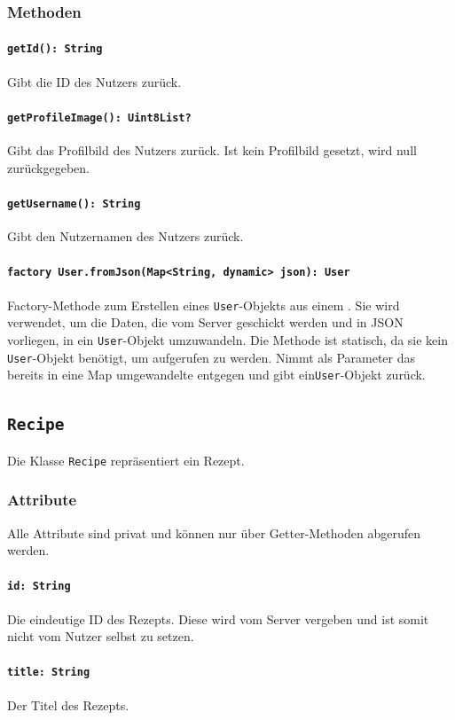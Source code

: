 \documentclass[parskip=full]{scrartcl}
\begin{document}
\subsubsection*{Methoden}
\paragraph{\texttt{getId(): String}}
Gibt die ID des Nutzers zurück.
\paragraph{\texttt{getProfileImage(): Uint8List?}}
Gibt das Profilbild des Nutzers zurück. Ist kein Profilbild gesetzt, wird null zurückgegeben.
\paragraph{\texttt{getUsername(): String}}
Gibt den Nutzernamen des Nutzers zurück.
\paragraph{\texttt{factory User.fromJson(Map<String, dynamic> json): User}} Factory-Methode zum Erstellen eines \texttt{User}-Objekts aus einem . Sie wird verwendet, um die Daten, die vom Server geschickt werden und in \Gls{JSON} vorliegen, in ein \texttt{User}-Objekt umzuwandeln. Die Methode ist statisch, da sie kein \texttt{User}-Objekt benötigt, um aufgerufen zu werden. Nimmt als Parameter das bereits in eine Map umgewandelte  entgegen und gibt ein\texttt{User}-Objekt zurück.
\newpage

\subsection{\texttt{Recipe}}
Die Klasse \texttt{Recipe} repräsentiert ein Rezept.
\subsubsection*{Attribute}
Alle Attribute sind privat und können nur über Getter-Methoden abgerufen werden.
\paragraph{\texttt{id: String}}
Die eindeutige ID des Rezepts. Diese wird vom Server vergeben und ist somit nicht vom Nutzer selbst zu setzen.
\paragraph{\texttt{title: String}}
Der Titel des Rezepts.
\end{document}
